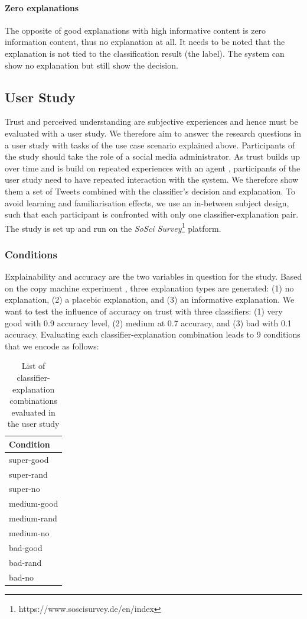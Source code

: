 \paragraph{Zero explanations}
The opposite of good explanations with high informative content is zero information content, thus no explanation at all. It needs to be noted that the explanation is not tied to the classification result (the label). The system can show no explanation but still show the decision. 



\subsection{User Study}
Trust and perceived understanding are subjective experiences and hence must be evaluated with a user study. We therefore aim to answer the research questions in a user study with tasks of the use case scenario explained above. Participants of the study should take the role of a social media administrator. As trust builds up over time and is build on repeated experiences with an agent \cite{rempel1985trust}, participants of the user study need to have repeated interaction with the system. We therefore show them a set of Tweets combined with the classifier's decision and explanation. To avoid learning and familiarisation effects, we use an in-between subject design, such that each participant is confronted with only one classifier-explanation pair. The study is set up and run on the \textit{SoSci Survey}\footnote{https://www.soscisurvey.de/en/index} platform.\newline

\subsubsection{Conditions}
Explainability and accuracy are the two variables in question for the study. Based on the copy machine experiment \cite{langer1978mindlessness}, three explanation types are generated: (1) no explanation, (2) a placebic explanation, and (3) an informative explanation. We want to test the influence of accuracy on trust with three classifiers: (1) very good with 0.9 accuracy level, (2) medium at 0.7 accuracy, and (3) bad with 0.1 accuracy. Evaluating each classifier-explanation combination leads to 9 conditions that we encode as follows:
\begin{table}[H]
	\centering
	\begin{tabular}{l}
		\textbf{Condition}\\ \midrule
		super-good\\
		super-rand\\
		super-no\\
		medium-good\\
		medium-rand\\
		medium-no\\
		bad-good\\
		bad-rand\\
		bad-no\\ \bottomrule
	\end{tabular}
	\caption{List of classifier-explanation combinations evaluated in the user study}
	\label{tab:conditions}
\end{table} 

